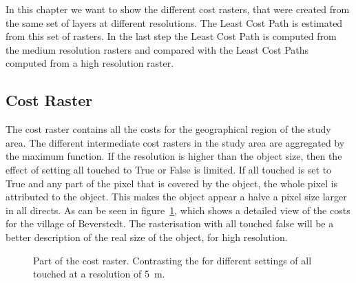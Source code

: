
In this chapter we want to show the different cost rasters, that were created from the same set of layers at different resolutions.
The Least Cost Path is estimated from this set of rasters.
In the last step the Least Cost Path is computed from the medium resolution rasters and compared with the Least Cost Paths computed from a high resolution raster.

\subsection{Cost Raster}\label{subsec:cost-raster}

The cost raster contains all the costs for the geographical region of the study area.
The different intermediate cost rasters in the study area are aggregated by the maximum function.
If the resolution is higher than the object size, then the effect of setting all touched to True or False is limited.
If all touched is set to True and any part of the pixel that is covered by the object, the whole pixel is attributed to the object.
This makes the object appear a halve a pixel size larger in all directs.
As can be seen in figure~\ref{fig:costs_5m}, which shows a detailed view of the costs for the village of Beverstedt.
The rasterisation with all touched false will be a better description of the real size of the object, for high resolution.
\begin{figure}
	\centering

	\qquad
	\caption{Part of the cost raster. Contrasting the for different settings of all touched at a resolution of 5~m.}
	\label{fig:costs_5m}
\end{figure}

